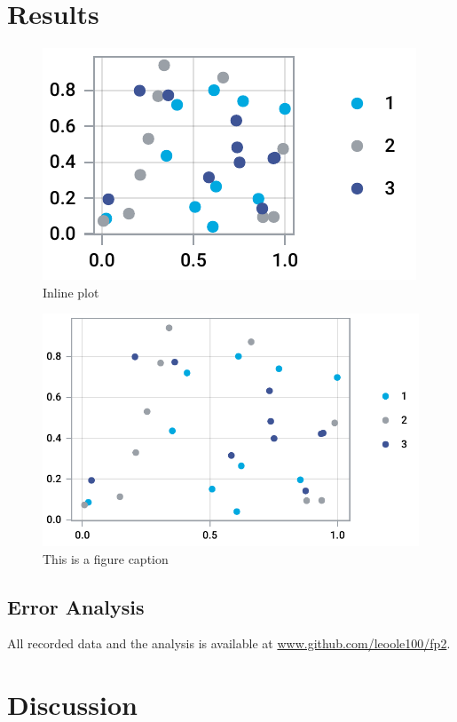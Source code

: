 \documentclass[
    parskip=half, 
    twoside=false,
    twocolumn=true,
    fontsize=11pt,
]{scrarticle}
\begin{document}
\section{Results}
\begin{figure}[H]
    \centering
    \includegraphics{fig/2024-10-18 points.pdf}
    \caption{Inline plot}
\end{figure}
\begin{figure}
    \centering \includegraphics{fig/2024-10-18 points large.pdf}
    \caption{This is a figure caption}
\end{figure}
\blindtext[3]

\subsection{Error Analysis}
\blindtext

All recorded data and the analysis is available at \url{www.github.com/leoole100/fp2}.

\pagebreak
\section{Discussion}
\blindtext
\end{document}
